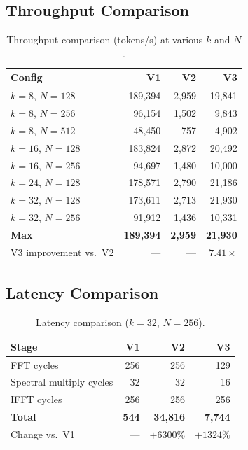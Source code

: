 \documentclass[11pt,a4paper]{article}
\theoremstyle{definition}
\theoremstyle{remark}
\begin{document}
\subsection{Throughput Comparison}

\begin{table}[h]
\centering
\caption{Throughput comparison (tokens/s) at various $k$ and $N$.}
\label{tab:throughput}
\begin{tabular}{lrrr}
\toprule
\textbf{Config} & \textbf{V1} & \textbf{V2} & \textbf{V3} \\
\midrule
$k=8$, $N=128$ & 189{,}394 & 2{,}959 & 19{,}841 \\
$k=8$, $N=256$ & 96{,}154 & 1{,}502 & 9{,}843 \\
$k=8$, $N=512$ & 48{,}450 & 757 & 4{,}902 \\
$k=16$, $N=128$ & 183{,}824 & 2{,}872 & 20{,}492 \\
$k=16$, $N=256$ & 94{,}697 & 1{,}480 & 10{,}000 \\
$k=24$, $N=128$ & 178{,}571 & 2{,}790 & 21{,}186 \\
$k=32$, $N=128$ & 173{,}611 & 2{,}713 & 21{,}930 \\
$k=32$, $N=256$ & 91{,}912 & 1{,}436 & 10{,}331 \\
\midrule
\textbf{Max} & \textbf{189{,}394} & \textbf{2{,}959} & \textbf{21{,}930} \\
V3 improvement vs.\ V2 & --- & --- & $7.41\times$ \\
\bottomrule
\end{tabular}
\end{table}

\subsection{Latency Comparison}

\begin{table}[h]
\centering
\caption{Latency comparison ($k=32$, $N=256$).}
\label{tab:latency}
\begin{tabular}{lrrr}
\toprule
\textbf{Stage} & \textbf{V1} & \textbf{V2} & \textbf{V3} \\
\midrule
FFT cycles & 256 & 256 & 129 \\
Spectral multiply cycles & 32 & 32 & 16 \\
IFFT cycles & 256 & 256 & 256 \\
\midrule
\textbf{Total} & \textbf{544} & \textbf{34{,}816} & \textbf{7{,}744} \\
Change vs.\ V1 & --- & $+6300\%$ & $+1324\%$ \\
\bottomrule
\end{tabular}
\end{table}
\end{document}
